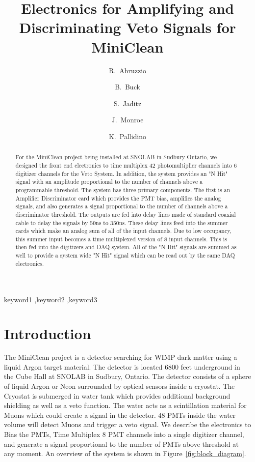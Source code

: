 \documentclass[preprint,12pt]{elsarticle}
\begin{document}
\begin{frontmatter}
\title{Electronics for Amplifying and Discriminating Veto Signals for MiniClean}
\author[mit]{R.~Abruzzio}
\author[mit]{B.~Buck}
\author[lanl]{S.~Jaditz}
\author[rhul]{J.~Monroe}
\author[mit]{K.~Pallidino}
\address[lanl]{Los Alamos National Laboratory, Los Alamos, NM, USA}
\address[mit]{Massachusetts Institute of Technology, Cambridge, MA, USA}
\address[rhul]{Royal Holloway University of London, Egham, Surrey, UK}
\begin{abstract}
For the MiniClean project being installed at SNOLAB in Sudbury Ontario, we designed the front end electronics to time multiplex 42 photomultiplier channels into 6 digitizer channels for the Veto System.  In addition, the system provides an "N Hit" signal with an amplitude proportional to the number of channels above a programmable threshold.  The system has three primary components.  The first is an Amplifier Discriminator card which provides the PMT bias, amplifies the analog signals, and also generates a signal proportional to the number of channels above a discriminator threshold.  The outputs are fed into delay lines made of standard coaxial cable to delay the signals by 50ns to 350ns.  These delay lines feed into the summer cards which make an analog sum of all of the input channels.  Due to low occupancy, this summer input becomes a time multiplexed version of 8 input channels.  This is then fed into the digitizers and DAQ system.  All of the "N Hit" signals are summed as well to provide a system wide "N Hit" signal which can be read out by the same DAQ electronics.
\end{abstract}

\begin{keyword}
keyword1 \sep keyword2 \sep keyword3
\end{keyword}

\end{frontmatter}

\section{Introduction}
\label{Introduction}
The MiniClean project is a detector searching for WIMP dark matter using a liquid Argon target material.  The detector is located 6800 feet underground in the Cube Hall at SNOLAB in Sudbury, Ontario.  The detector consists of a sphere of liquid Argon or Neon surrounded by optical sensors inside a cryostat.  The Cryostat is submerged in water tank which provides additional background shielding as well as a veto function.  The water acts as a scintillation material for Muons which could create a signal in the detector.  48 PMTs inside the water volume will detect Muons and trigger a veto signal.  We describe the electronics to Bias the PMTs, Time Multiplex 8 PMT channels into a single digitizer channel, and generate a signal proportional to the number of PMTs above threshold at any moment.  An overview of the system is shown in Figure~\ref{fig:block_diagram}.
\end{document}
